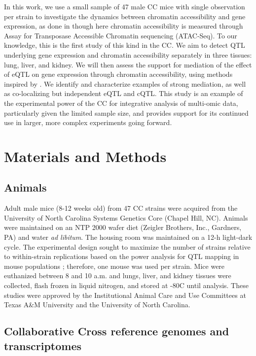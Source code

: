 In this work, we use a small sample of 47 male CC mice with single observation per strain to investigate the dynamics between chromatin accessibility and gene expression, as done in \cite{Degner2012} though here chromatin accessibility is measured through Assay for Transposase Accessible Chromatin sequencing (ATAC-Seq). To our knowledge, this is the first study of this kind in the CC. We aim to detect QTL underlying gene expression and chromatin accessibility separately in three tissues: lung, liver, and kidney. We will then assess the support for mediation of the effect of eQTL on gene expression through chromatin accessibility, using methods inspired by \citep{Chick2016}. We identify and characterize examples of strong mediation, as well as co-localizing but independent eQTL and cQTL. This study is an example of the experimental power of the CC for integrative analysis of multi-omic data, particularly given the limited sample size, and provides support for its continued use in larger, more complex experiments going forward.

\section{Materials and Methods}

\subsection{Animals}

Adult male mice (8-12 weeks old) from 47 CC strains were acquired from the University of North Carolina Systems Genetics Core (Chapel Hill, NC). Animals were maintained on an NTP 2000 wafer diet (Zeigler Brothers, Inc., Gardners, PA) and water \textit{ad libitum}. The housing room was maintained on a 12-h light-dark cycle. The experimental design sought to maximize the number of strains relative to within-strain replications based on the power analysis for QTL mapping in mouse populations \citep{Kaeppler1997}; therefore, one mouse was used per strain. Mice were euthanized between 8 and 10 a.m. and lungs, liver, and kidney tissues were collected, flash frozen in liquid nitrogen, and stored at -80\degree C until analysis. These studies were approved by the Institutional Animal Care and Use Committees at Texas A\&M University and the University of North Carolina.

\subsection{Collaborative Cross reference genomes and transcriptomes}

